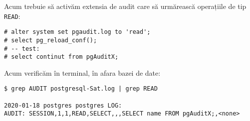 Acum trebuie să activăm extensia de audit care să urmărească operațiile de tip
\texttt{READ}:
{
  \small
\begin{verbatim}
# alter system set pgaudit.log to 'read';
# select pg_reload_conf();
# -- test:
# select continut from pgAuditX;
\end{verbatim}
}

Acum verificăm în terminal, în afara bazei de date:
{
  \small
\begin{verbatim}
$ grep AUDIT postgresql-Sat.log | grep READ

2020-01-18 postgres postgres LOG: 
AUDIT: SESSION,1,1,READ,SELECT,,,SELECT name FROM pgAuditX;,<none>
\end{verbatim}
}


